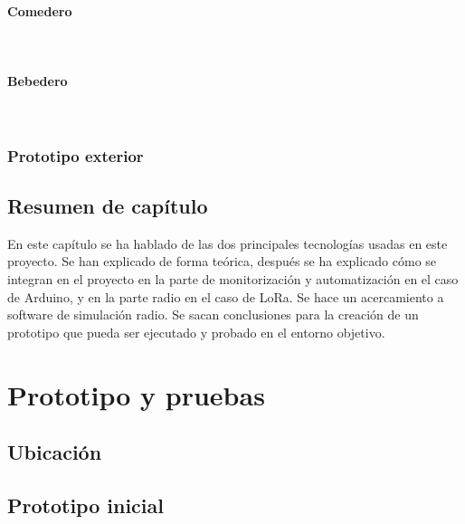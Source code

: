 \documentclass[12pt]{article}
\newcommand{\subsubsubsection}[1]{\paragraph{#1}\mbox{}\\}
\begin{document}
	

	\subsubsubsection{Comedero}
	
	\subsubsubsection{Bebedero}
	
	\subsubsection{Prototipo exterior}
		
	\subsection[Resumen del capítulo]{Resumen de capítulo}
	
	En este capítulo se ha hablado de las dos principales tecnologías usadas en este proyecto. Se han explicado de forma teórica, después se ha explicado cómo se integran en el proyecto en la parte de monitorización y automatización en el caso de Arduino, y en la parte radio en el caso de LoRa. Se hace un acercamiento a software de simulación radio. Se sacan conclusiones para la creación de un prototipo que pueda ser ejecutado y probado en el entorno objetivo.
	\pagebreak
	
	
	\section[Prototipo y pruebas]{Prototipo y pruebas}
	
	\subsection[Ubicación]{Ubicación}
	\subsection[Prototipo inicial]{Prototipo inicial}
\end{document}
